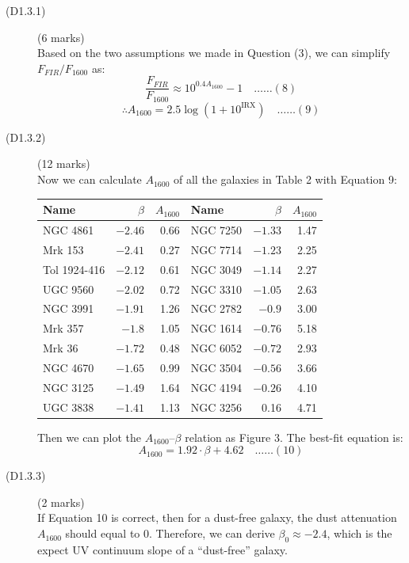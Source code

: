 \begin{description}
\item[(D1.3.1)] \hfill(6 marks)\\
  Based on the two assumptions we made in Question (3), we can simplify
  $F_{FIR}/F_{1600}$ as:
  \[ \frac{F_{FIR}}{F_{1600}} \approx 10^{0.4 A_{1600}} - 1
     \quad\ldots\ldots(8) \]
  \[ \therefore A_{1600} = 2.5\log\left(1 + 10^{\mathrm{IRX}}\right)
     \quad\ldots\ldots(9) \]

\item[(D1.3.2)] \hfill(12 marks)\\
  Now we can calculate $A_{1600}$ of all the galaxies in Table 2 with
  Equation 9:

  \begin{center}
  \begin{tabular}{lrr|lrr}
    Name & $\beta$ & $A_{1600}$ & Name & $\beta$ & $A_{1600}$ \\
    \hline
    NGC 4861     & $-2.46$ & 0.66 & NGC 7250 & $-1.33$ & 1.47 \\
    Mrk 153      & $-2.41$ & 0.27 & NGC 7714 & $-1.23$ & 2.25 \\
    Tol 1924-416 & $-2.12$ & 0.61 & NGC 3049 & $-1.14$ & 2.27 \\
    UGC 9560     & $-2.02$ & 0.72 & NGC 3310 & $-1.05$ & 2.63 \\
    NGC 3991     & $-1.91$ & 1.26 & NGC 2782 & $-0.9$  & 3.00 \\
    Mrk 357      & $-1.8$  & 1.05 & NGC 1614 & $-0.76$ & 5.18 \\
    Mrk 36       & $-1.72$ & 0.48 & NGC 6052 & $-0.72$ & 2.93 \\
    NGC 4670     & $-1.65$ & 0.99 & NGC 3504 & $-0.56$ & 3.66 \\
    NGC 3125     & $-1.49$ & 1.64 & NGC 4194 & $-0.26$ & 4.10 \\
    UGC 3838     & $-1.41$ & 1.13 & NGC 3256 & 0.16    & 4.71 \\
  \end{tabular}
  \end{center}

  Then we can plot the $A_{1600}$--$\beta$ relation as Figure 3. The best-fit
  equation is:
  \[ A_{1600} = 1.92\cdot\beta + 4.62 \quad\ldots\ldots(10) \]

\item[(D1.3.3)] \hfill(2 marks)\\
  If Equation 10 is correct, then for a dust-free galaxy, the dust
  attenuation $A_{1600}$ should equal to 0. Therefore, we can derive
  $\beta_0 \approx -2.4$, which is the expect UV continuum slope of a
  ``dust-free'' galaxy.


\end{description}
